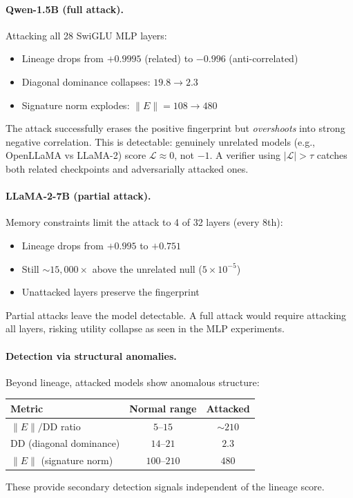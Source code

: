 \paragraph{Qwen-1.5B (full attack).} Attacking all 28 SwiGLU MLP layers:
\begin{itemize}[nosep]
\item Lineage drops from $+0.9995$ (related) to $\mathbf{-0.996}$ (anti-correlated)
\item Diagonal dominance collapses: $19.8 \to 2.3$
\item Signature norm explodes: $\|E\| = 108 \to 480$
\end{itemize}
The attack successfully erases the positive fingerprint but \emph{overshoots} into strong negative correlation. This is detectable: genuinely unrelated models (e.g., OpenLLaMA vs LLaMA-2) score $\mathcal{L} \approx 0$, not $-1$. A verifier using $|\mathcal{L}| > \tau$ catches both related checkpoints and adversarially attacked ones.

\paragraph{LLaMA-2-7B (partial attack).} Memory constraints limit the attack to 4 of 32 layers (every 8th):
\begin{itemize}[nosep]
\item Lineage drops from $+0.995$ to $+0.751$
\item Still ${\sim}15{,}000\times$ above the unrelated null ($5 \times 10^{-5}$)
\item Unattacked layers preserve the fingerprint
\end{itemize}
Partial attacks leave the model detectable. A full attack would require attacking all layers, risking utility collapse as seen in the MLP experiments.

\paragraph{Detection via structural anomalies.} Beyond lineage, attacked models show anomalous structure:
\begin{center}
\small
\begin{tabular}{@{}lcc@{}}
\toprule
Metric & Normal range & Attacked \\
\midrule
$\|E\| / \mathrm{DD}$ ratio & $5$--$15$ & ${\sim}210$ \\
DD (diagonal dominance) & $14$--$21$ & $2.3$ \\
$\|E\|$ (signature norm) & $100$--$210$ & $480$ \\
\bottomrule
\end{tabular}
\end{center}
These provide secondary detection signals independent of the lineage score.
